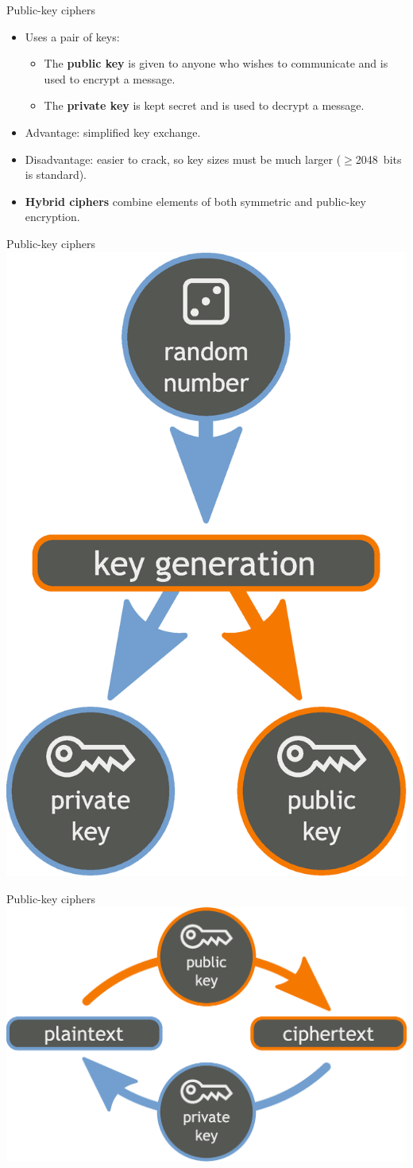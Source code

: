 \documentclass[%
mode=present,%
paper=smartboard,
size=20pt,
]{powerdot}
\begin{document}
\begin{slide}{Public-key ciphers}
  \begin{itemize}
  \item Uses a pair of keys:
    \begin{itemize}
    \item The \textbf{public key} is given to anyone who wishes to
      communicate and is used to encrypt a message.
    \item The \textbf{private key} is kept secret and is used to
      decrypt a message.
    \end{itemize}
  \item Advantage: simplified key exchange.
  \item Disadvantage: easier to crack, so key sizes must be much
    larger ($\geq$2048~bits is standard).
  \item \textbf{Hybrid ciphers} combine elements of both symmetric
    and public-key encryption.
  \end{itemize}
\end{slide}

\begin{slide}[toc=]{Public-key ciphers}
\centering\includegraphics[width=0.35\linewidth]{images/Orange_blue_public_private_keygeneration_en.eps}
\end{slide}

\begin{slide}[toc=]{Public-key ciphers}
\centering\includegraphics[width=0.9\linewidth]{images/Orange_blue_public_key_cryptography_en.eps}
\end{slide}
\end{document}
